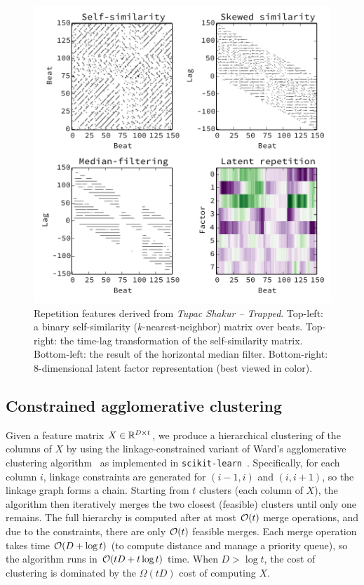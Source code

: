 \documentclass{article}
\begin{document}
\begin{figure}
\centering%
\includegraphics[width=\columnwidth]{figs/rep}
\vspace{-2\baselineskip}
\caption{Repetition features derived from \emph{Tupac Shakur -- Trapped}. 
Top-left: a binary self-similarity ($k$-nearest-neighbor) matrix over beats.
Top-right: the time-lag transformation of the self-similarity matrix.
Bottom-left: the result of the horizontal median filter.
Bottom-right: 8-dimensional latent factor representation (best viewed in color).}
\label{fig:rep}
\end{figure}

\subsection{Constrained agglomerative clustering}
\label{sec:clustering}
Given a feature matrix $X \in \mathbb{R}^{D\times t}$, we produce a hierarchical clustering of the columns of $X$ by using the
linkage-constrained variant of Ward's agglomerative clustering algorithm~\cite{ward1963hierarchical} as implemented in
\texttt{scikit-learn}~\cite{pedregosa2011scikit}.  Specifically, for each column $i$, linkage constraints are generated
for $(i-1, i)$ and $(i, i+1)$, so the linkage graph forms a chain.  Starting from $t$ clusters (each column of $X$), the 
algorithm then iteratively merges the two closest (feasible) clusters until only one remains.
The full hierarchy is computed after at most $\mathcal{O}(t)$ merge operations, and due to the constraints, 
there are only $\mathcal{O}(t)$ feasible merges. 
Each merge operation takes time $\mathcal{O}(D + \log t)$ (to compute distance and manage a priority queue), so the algorithm runs in $\mathcal{O}(tD + t\log t)$ time.
When $D > \log t$, the cost of clustering is dominated by the $\Omega(tD)$ cost of computing $X$.
\end{document}
